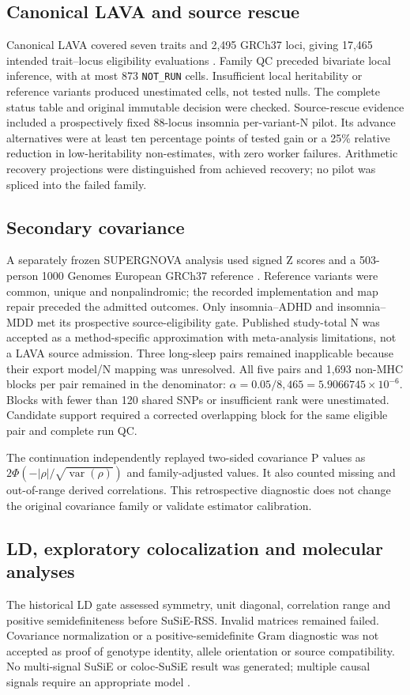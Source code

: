 \documentclass[11pt]{article}
\begin{document}
\subsection*{Canonical LAVA and source rescue}
Canonical LAVA covered seven traits and 2,495 GRCh37 loci, giving 17,465 intended trait--locus eligibility evaluations \cite{lava}. Family QC preceded bivariate local inference, with at most 873 \texttt{NOT\_RUN} cells. Insufficient local heritability or reference variants produced unestimated cells, not tested nulls. The complete status table and original immutable decision were checked. Source-rescue evidence included a prospectively fixed 88-locus insomnia per-variant-N pilot. Its advance alternatives were at least ten percentage points of tested gain or a 25\% relative reduction in low-heritability non-estimates, with zero worker failures. Arithmetic recovery projections were distinguished from achieved recovery; no pilot was spliced into the failed family.

\subsection*{Secondary covariance}
A separately frozen SUPERGNOVA analysis used signed Z scores and a 503-person 1000 Genomes European GRCh37 reference \cite{supergnova}. Reference variants were common, unique and nonpalindromic; the recorded implementation and map repair preceded the admitted outcomes. Only insomnia--ADHD and insomnia--MDD met its prospective source-eligibility gate. Published study-total N was accepted as a method-specific approximation with meta-analysis limitations, not a LAVA source admission. Three long-sleep pairs remained inapplicable because their export model/N mapping was unresolved. All five pairs and 1,693 non-MHC blocks per pair remained in the denominator: $\alpha=0.05/8{,}465=5.9066745\times10^{-6}$. Blocks with fewer than 120 shared SNPs or insufficient rank were unestimated. Candidate support required a corrected overlapping block for the same eligible pair and complete run QC.

The continuation independently replayed two-sided covariance P values as $2\Phi(-|\rho|/\sqrt{\operatorname{var}(\rho)})$ and family-adjusted values. It also counted missing and out-of-range derived correlations. This retrospective diagnostic does not change the original covariance family or validate estimator calibration.

\subsection*{LD, exploratory colocalization and molecular analyses}
The historical LD gate assessed symmetry, unit diagonal, correlation range and positive semidefiniteness before SuSiE-RSS. Invalid matrices remained failed. Covariance normalization or a positive-semidefinite Gram diagnostic was not accepted as proof of genotype identity, allele orientation or source compatibility. No multi-signal SuSiE or coloc-SuSiE result was generated; multiple causal signals require an appropriate model \cite{colocsusie}.
\end{document}

